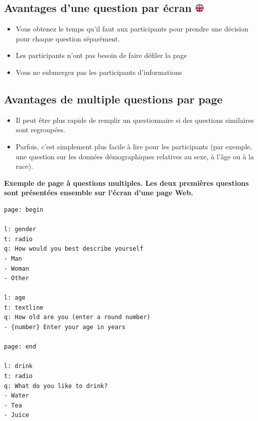 \documentclass[
]{book}
\providecommand{\tightlist}{%
  \setlength{\itemsep}{0pt}\setlength{\parskip}{0pt}}
\begin{document}
\hypertarget{avantages-dune-question-par-uxe9cran}{%
\subsection[Avantages d'une question par écran ]{\texorpdfstring{Avantages d'une question par écran \href{https://www.psytoolkit.org/doc3.4.0/online-survey-syntax.html\#_advantages_of_one_question_per_screen}{\protect\includegraphics{img/ukflag.png}}}{Avantages d'une question par écran }}\label{avantages-dune-question-par-uxe9cran}}

\begin{itemize}
\tightlist
\item
  Vous obtenez le temps qu'il faut aux participants pour prendre une décision pour chaque question séparément.
\item
  Les participants n'ont pas besoin de faire défiler la page
\item
  Vous ne submergez pas les participants d'informations
\end{itemize}

\hypertarget{avantages-de-multiple-questions-par-page}{%
\subsection{Avantages de multiple questions par page}\label{avantages-de-multiple-questions-par-page}}

\begin{itemize}
\tightlist
\item
  Il peut être plus rapide de remplir un questionnaire si des questions similaires sont regroupées.
\item
  Parfois, c'est simplement plus facile à lire pour les participants (par exemple, une question sur les données démographiques relatives au sexe, à l'âge ou à la race).
\end{itemize}

\textbf{Exemple de page à questions multiples. Les deux premières questions sont présentées ensemble sur l'écran d'une page Web.}

\begin{verbatim}
page: begin

l: gender
t: radio
q: How would you best describe yourself
- Man
- Woman
- Other

l: age
t: textline
q: How old are you (enter a round number)
- {number} Enter your age in years

page: end

l: drink
t: radio
q: What do you like to drink?
- Water
- Tea
- Juice
\end{verbatim}
\end{document}
